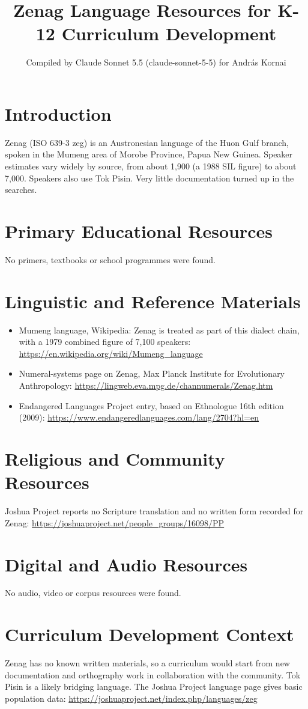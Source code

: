\documentclass[12pt]{article}
\title{Zenag Language Resources for K-12 Curriculum Development}
\author{Compiled by Claude Sonnet 5.5 (claude-sonnet-5-5) for Andr\'as Kornai}
\date{}
\begin{document}
\maketitle

\section{Introduction}
Zenag (ISO 639-3 zeg) is an Austronesian language of the Huon Gulf branch, spoken in the Mumeng area of Morobe Province, Papua New Guinea. Speaker estimates vary widely by source, from about 1,900 (a 1988 SIL figure) to about 7,000. Speakers also use Tok Pisin. Very little documentation turned up in the searches.

\section{Primary Educational Resources}
No primers, textbooks or school programmes were found.

\section{Linguistic and Reference Materials}
\begin{itemize}
\item Mumeng language, Wikipedia: Zenag is treated as part of this dialect chain, with a 1979 combined figure of 7,100 speakers: \url{https://en.wikipedia.org/wiki/Mumeng_language}
\item Numeral-systems page on Zenag, Max Planck Institute for Evolutionary Anthropology: \url{https://lingweb.eva.mpg.de/channumerals/Zenag.htm}
\item Endangered Languages Project entry, based on Ethnologue 16th edition (2009): \url{https://www.endangeredlanguages.com/lang/2704?hl=en}
\end{itemize}

\section{Religious and Community Resources}
Joshua Project reports no Scripture translation and no written form recorded for Zenag: \url{https://joshuaproject.net/people_groups/16098/PP}

\section{Digital and Audio Resources}
No audio, video or corpus resources were found.

\section{Curriculum Development Context}
Zenag has no known written materials, so a curriculum would start from new documentation and orthography work in collaboration with the community. Tok Pisin is a likely bridging language. The Joshua Project language page gives basic population data: \url{https://joshuaproject.net/index.php/languages/zeg}
\end{document}
